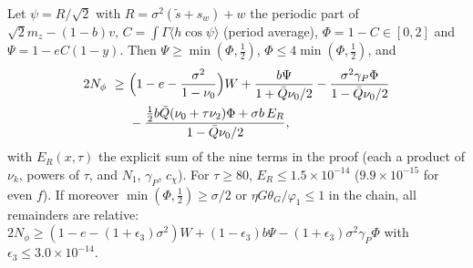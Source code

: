 \begin{lemma} \proofst
\label{lem:BL3}
Let $\psi=R/\sqrt2$ with $R=\sigma^2(\tilde s+s_w)+w$ the periodic part of $\sqrt2m_z-(1-b)v$, $C=\int\Gamma\langle h\cos\psi\rangle$ (period average),
$\Phi=1-C\in[0,2]$ and $\Psi=1-eC(1-y)$. Then $\Psi\ge\min(\Phi,\tfrac12)$, $\Phi\le4\min(\Phi,\tfrac12)$, and
\begin{equation}
\begin{aligned}
2N_\phi\ \ge\ &\Big(1-e-\frac{\sigma^2}{1-\nu_0}\Big)W+\frac{b\Psi}{1+\Qb\nu_0/2}-\frac{\sigma^2\gamma_P\Phi}{1-\Qb\nu_0/2}\\
&-\frac{\tfrac12b\Qb(\nu_0+\tau\nu_2)\Phi+\sigma b\,E_R}{1-\Qb\nu_0/2},
\end{aligned}
\label{eq:BL3}
\end{equation}
with $E_R(x,\tau)$ the explicit sum of the nine terms in the proof (each a product of $\nu_k$, powers of $\tau$, and $N_1$, $\gamma_P$, $c_\chi$).
For $\tau\ge80$, $E_R\le1.5\times10^{-14}$ ($9.9\times10^{-15}$ for even $f$). If moreover $\min(\Phi,\tfrac12)\ge\sigma/2$ or $\eta G\theta_G/\varphi_1\le1$ in the chain, all remainders are
relative:  $2N_\phi\ge(1-e-(1+\epsilon_3)\sigma^2)W+(1-\epsilon_3)b\Psi-(1+\epsilon_3)\sigma^2\gamma_P\Phi$ with $\epsilon_3\le3.0\times10^{-14}$.
\end{lemma}
